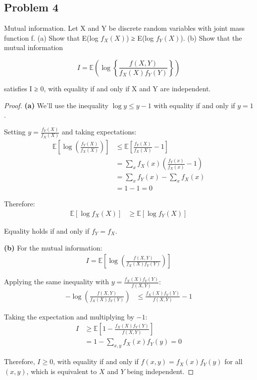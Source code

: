\documentclass[letterpaper, 11pt]{article}
\newcommand{\1}{\mathds{1}}	%
\theoremstyle{definition}
\begin{document}
\subsection*{Problem 4}
Mutual information. Let X and Y be discrete random variables with joint mass function f.
(a) Show that E(log $f_{X}(X)$) ≥ E(log $f_{Y}(X)$).
(b) Show that the mutual information

$$I = \mathbb{E}\left(\log \left\{\frac{f(X, Y)}{f_{X}(X)f_{Y}(Y)}\right\}\right)$$

satisfies I ≥ 0, with equality if and only if X and Y are independent.
\begin{proof}
    \textbf{(a)} We'll use the inequality $\log y \leq y - 1$ with equality if and only if $y = 1$.

Setting $y = \frac{f_Y(X)}{f_X(X)}$ and taking expectations:
\begin{align*}
\mathbb{E}\left[\log\left(\frac{f_Y(X)}{f_X(X)}\right)\right] &\leq \mathbb{E}\left[\frac{f_Y(X)}{f_X(X)} - 1\right]\\
&= \sum_x f_X(x)\left(\frac{f_Y(x)}{f_X(x)} - 1\right)\\
&= \sum_x f_Y(x) - \sum_x f_X(x)\\
&= 1 - 1 = 0
\end{align*}

Therefore:
\begin{align*}
\mathbb{E}[\log f_X(X)] &\geq \mathbb{E}[\log f_Y(X)]
\end{align*}

Equality holds if and only if $f_Y = f_X$.

\textbf{(b)} For the mutual information:
\begin{align*}
I = \mathbb{E}\left[\log\left(\frac{f(X,Y)}{f_X(X)f_Y(Y)}\right)\right]
\end{align*}

Applying the same inequality with $y = \frac{f_X(X)f_Y(Y)}{f(X,Y)}$:
\begin{align*}
-\log\left(\frac{f(X,Y)}{f_X(X)f_Y(Y)}\right) &\leq \frac{f_X(X)f_Y(Y)}{f(X,Y)} - 1
\end{align*}

Taking the expectation and multiplying by $-1$:
\begin{align*}
I &\geq \mathbb{E}\left[1 - \frac{f_X(X)f_Y(Y)}{f(X,Y)}\right]\\
&= 1 - \sum_{x,y}f_X(x)f_Y(y) = 0
\end{align*}

Therefore, $I \geq 0$, with equality if and only if $f(x,y) = f_X(x)f_Y(y)$ for all $(x,y)$, which is equivalent to $X$ and $Y$ being independent.
\end{proof}
\end{document}

